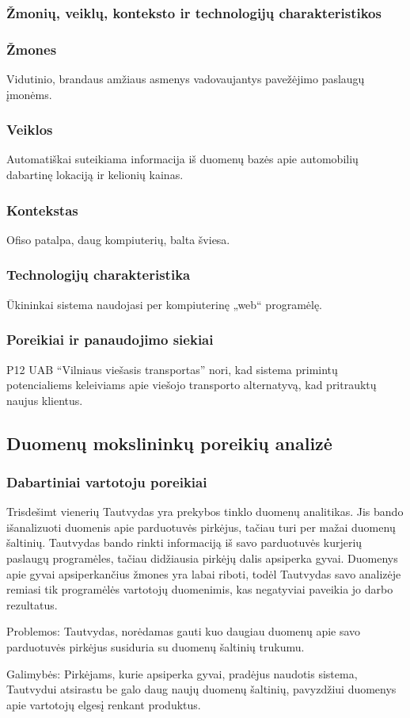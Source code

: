 \documentclass{article}
\begin{document}
\subsubsection{Žmonių, veiklų, konteksto ir technologijų charakteristikos}
\subsubsection*{Žmones}
	Vidutinio, brandaus amžiaus asmenys vadovaujantys pavežėjimo paslaugų įmonėms.
\subsubsection*{Veiklos}
	Automatiškai suteikiama informacija iš duomenų bazės apie automobilių dabartinę lokaciją ir kelionių kainas. 
\subsubsection*{Kontekstas}
	Ofiso patalpa, daug kompiuterių, balta šviesa.
\subsubsection*{Technologijų charakteristika}	
	Ūkininkai sistema naudojasi per kompiuterinę „web“ programėlę.
\subsubsection{Poreikiai ir panaudojimo siekiai}
	P12 UAB “Vilniaus viešasis transportas” nori, kad sistema primintų potencialiems keleiviams apie viešojo transporto alternatyvą, kad pritrauktų naujus klientus.
	\pagebreak

\subsection{Duomenų mokslininkų poreikių analizė}
\subsubsection*{Dabartiniai vartotoju poreikiai}
	Trisdešimt vienerių Tautvydas yra prekybos tinklo duomenų analitikas. Jis bando išanalizuoti duomenis apie parduotuvės pirkėjus, tačiau turi per mažai duomenų šaltinių. Tautvydas bando rinkti informaciją iš savo parduotuvės kurjerių paslaugų programėles, tačiau didžiausia pirkėjų dalis apsiperka gyvai. Duomenys apie gyvai apsiperkančius žmones yra labai riboti, todėl Tautvydas savo analizėje remiasi tik programėlės vartotojų duomenimis, kas negatyviai paveikia jo darbo rezultatus.\par
Problemos: Tautvydas, norėdamas gauti kuo daugiau duomenų apie savo parduotuvės pirkėjus susiduria su duomenų šaltinių trukumu.\par
Galimybės: Pirkėjams, kurie apsiperka gyvai, pradėjus naudotis sistema, Tautvydui atsirastu be galo daug naujų duomenų šaltinių, pavyzdžiui duomenys apie vartotojų elgesį renkant produktus.
\end{document}
